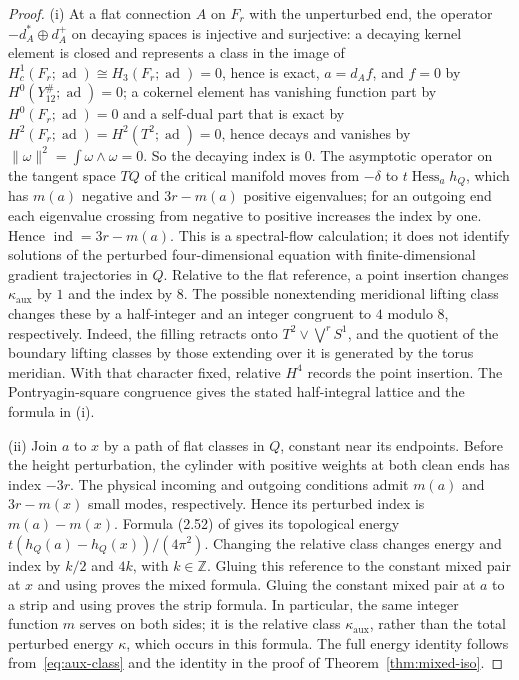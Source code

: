 \documentclass[11pt]{amsart}
\theoremstyle{definition}
\theoremstyle{remark}
\theoremstyle{plain}
\numberwithin{equation}{section}
\newcommand{\ZZ}{\mathbb{Z}}
\newcommand{\ad}{\operatorname{ad}}
\newcommand{\ind}{\operatorname{ind}}
\begin{document}
\begin{proof}
(i) At a flat connection $A$ on $F_r$ with the unperturbed end, the
operator $-d_A^*\oplus d_A^+$ on decaying spaces is injective and
surjective: a decaying kernel element is closed and represents a class in
the image of $H^1_c(F_r;\ad)\cong H_3(F_r;\ad)=0$, hence is exact, $a=d_Af$,
and $f=0$ by $H^0(Y_{12}^\#;\ad)=0$; a cokernel element has vanishing
function part by $H^0(F_r;\ad)=0$ and a self-dual part that is exact by
$H^2(F_r;\ad)=H^2(T^2;\ad)=0$, hence decays and vanishes by
$\|\omega\|^2=\int\omega\wedge\omega=0$. So the decaying index is $0$. The
asymptotic operator on the tangent space $TQ$ of the critical manifold
moves from $-\delta$ to $t\operatorname{Hess}_a h_Q$, which has $m(a)$ negative
and $3r-m(a)$ positive eigenvalues; for an outgoing end each eigenvalue
crossing from negative to positive increases the index by one. Hence
$\ind=3r-m(a)$. This is a spectral-flow calculation; it does not
identify solutions of the perturbed four-dimensional equation with
finite-dimensional gradient trajectories in $Q$.
Relative to the flat reference, a point insertion changes
$\kappa_{\mathrm{aux}}$ by $1$ and the index by $8$. The possible
nonextending meridional lifting class changes these by a half-integer
and an integer congruent to $4$ modulo $8$, respectively.
Indeed, the filling retracts onto $T^2\vee\bigvee^rS^1$, and
the quotient of the boundary lifting classes by those extending
over it is generated by the torus meridian. With that character
fixed, relative $H^4$ records the point insertion. The
Pontryagin-square congruence gives the stated half-integral lattice
and the formula in (i).

(ii) Join $a$ to $x$ by a path of flat classes in $Q$, constant
near its endpoints. Before the height perturbation, the cylinder
with positive weights at both clean ends has index $-3r$.
The physical incoming and outgoing conditions admit $m(a)$ and
$3r-m(x)$ small modes, respectively. Hence its perturbed index
is $m(a)-m(x)$. Formula (2.52) of \cite{DFL} gives its
topological energy $t(h_Q(a)-h_Q(x))/(4\pi^2)$.
Changing the relative class changes energy and index by
$k/2$ and $4k$, with $k\in\ZZ$.
Gluing this reference to the constant mixed pair at $x$ and
using \cite[Lemma~4.62, Proposition~4.65]{DFL} proves the mixed
formula. Gluing the constant mixed pair at $a$ to a strip and
using \cite[Proposition~4.69]{DFL} proves the strip formula.
In particular, the same integer function $m$ serves on both sides;
it is the relative class $\kappa_{\mathrm{aux}}$, rather than
the total perturbed energy $\kappa$, which occurs in this formula.
The full energy identity follows from~\eqref{eq:aux-class} and
the identity in the proof of Theorem~\ref{thm:mixed-iso}.


\end{proof}
\end{document}
